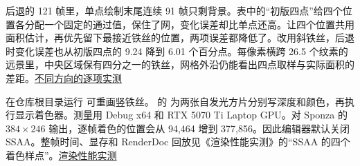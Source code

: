 后退的 121 帧里，单点绘制末尾连续 91 帧只剩背景。表中的“初版四点”给四个位置各分配一个固定的通过值，保住了网，变化误差却比单点还高。让四个位置共用面积估计，再优先留下最接近铁丝的位置，两项误差都降低了。改用斜铁丝，后退时变化误差也从初版四点的 9.24 降到 6.01 个百分点。每像素横跨 26.5 个纹素的远景里，中央区域保有四分之一的铁丝，网格外沿仍能看出四点取样与实际面积的差距。\href{run:../validation/mask-footprint-compare-rank/report.json}{不同方向的逐项实测}

在仓库根目录运行  可重画竖铁丝。 的  为两张自发光方片分别写深度和颜色，再执行显示着色器。测量用 Debug x64 和 RTX 5070 Ti Laptop GPU。对 Sponza 的 $384\times246$ 输出，逐帧着色的位置会从 94,464 增到 377,856。因此编辑器默认关闭 SSAA。整帧时间、显存和 RenderDoc 回放见《渲染性能实测》的“SSAA 的四个着色样点”。\href{run:Redflag-Rendering-Performance.pdf}{渲染性能实测}
